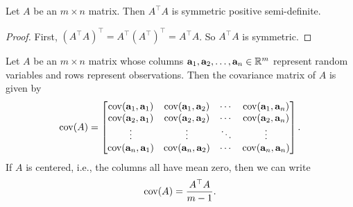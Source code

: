 \begin{lemma}
    Let \(A\) be an \(m \times n\) matrix.
    Then \(A^\top A\) is symmetric positive semi-definite.
\end{lemma}

\begin{proof}
    First, \((A^\top A)^\top = A^\top (A^\top)^\top = A^\top A\).
    So \(A^\top A\) is symmetric.
\end{proof}
\begin{definition}
    \def\a{\mathbf{a}}
    Let \(A\) be an \(m \times n\) matrix whose columns \(\a_1, \a_2,\dots,\a_n \in \RR^m\) represent random variables and rows represent observations.
    Then the covariance matrix of \(A\) is given by
    \[\cov(A) = \begin{bmatrix}
        \cov(\a_1, \a_1) & \cov(\a_1, \a_2) & \cdots & \cov(\a_1, \a_n)\\
        \cov(\a_2, \a_1) & \cov(\a_2, \a_2) & \cdots & \cov(\a_2, \a_n)\\
        \vdots & \vdots & \ddots & \vdots\\
        \cov(\a_n, \a_1) & \cov(\a_n, \a_2) & \cdots & \cov(\a_n, \a_n)\\
    \end{bmatrix}.\]
    If \(A\) is centered, i.e., the columns all have mean zero, then we can write
    \[\operatorname{cov}(A) = \frac{A^\top A}{m-1}.\]
\end{definition}





    
